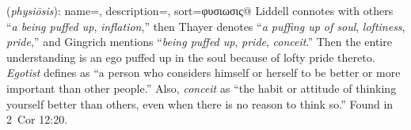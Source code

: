 \item[Egotist,]

(\textit{physiōsis}):
{
    name=,
    description={},
    sort=φυσιωσις@
}
Liddell connotes with others ``\emph{a being puffed up}, \emph{inflation},'' then Thayer denotes ``\emph{a puffing up of soul}, \emph{loftiness}, \emph{pride},'' and Gingrich mentions ``\emph{being puffed up}, \emph{pride}, \emph{conceit}.'' Then the entire understanding is an ego puffed up in the soul because of lofty pride thereto. \emph{Egotist} defines as ``a person who considers himself or herself to be better or more important than other people.'' Also, \emph{conceit} as ``the habit or attitude of thinking yourself better than others, even when there is no reason to think so.''
Found in 2~Cor 12:20.
